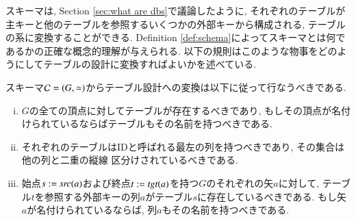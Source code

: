 
スキーマは, Section \ref{sec:what are dbs}で議論したように, それぞれのテーブルが主キーと他のテーブルを参照するいくつかの外部キーから構成される, テーブルの系に変換することができる. Definition \ref{def:schema}によってスキーマとは何であるかの正確な概念的理解が与えられる. 以下の規則はこのような物事をどのようにしてテーブルの設計に変換すればよいかを述べている.

\begin{rules}\label{rules:schema to tables}


スキーマ$\mathcal{C}=(G,\simeq)$からテーブル設計への変換は以下に従って行なうべきである.
\begin{enumerate}[(i)]
\item $G$の全ての頂点に対してテーブルが存在するべきであり, もしその頂点が名付けられているならばテーブルもその名前を持つべきである.
\item それぞれのテーブルはIDと呼ばれる最左の列を持つべきであり, その集合は他の列と二重の縦線
区分けされているべきである.
\item 始点$s:=\operatorname{\mathit{src}}(a)$および終点$t:=\operatorname{\mathit{tgt}}(a)$を持つ$G$のそれぞれの矢$a$に対して, テーブル$t$を参照する外部キーの列$a$がテーブル$s$に存在しているべきである. もし矢$a$が名付けられているならば, 列$a$もその名前を持つべきである.
\end{enumerate}

\end{rules}

